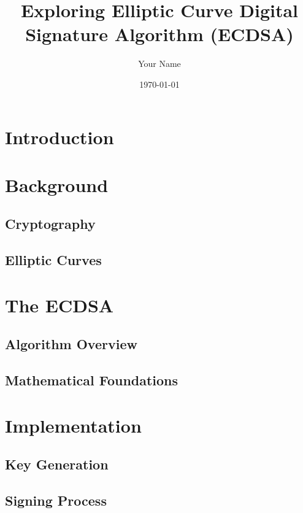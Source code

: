 \documentclass[12pt]{article}
\title{Exploring Elliptic Curve Digital Signature Algorithm (ECDSA)}
\author{Your Name}
\date{\today}
\begin{document}
\maketitle

\begin{abstract}
\end{abstract}

\section{Introduction}

\section{Background}
\subsection{Cryptography}
\subsection{Elliptic Curves}

\section{The ECDSA}
\subsection{Algorithm Overview}
\subsection{Mathematical Foundations}

\section{Implementation}
\subsection{Key Generation}
\subsection{Signing Process}
\end{document}
